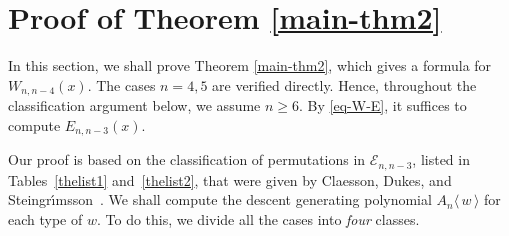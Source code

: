 \documentclass[11pt]{article}
\newcommand{\exactly}[2]{\ensuremath{\mathcal{E}_{#1,#2}}}
\newcommand{\+}{\mbox{\ensuremath{\scriptstyle{+}}}}
\newcommand{\glob}[1]{\ensuremath{\langle\, #1\,\rangle}}
\begin{document}
\section{Proof of Theorem \ref{main-thm2}}\label{sect-3}


In this section, we shall prove Theorem \ref{main-thm2}, which gives a formula for $W_{n,n-4}(x)$.
The cases $n=4,5$ are verified directly. Hence, throughout the classification argument below, we assume $n\geq6$.
By \eqref{eq-W-E}, it suffices to compute $E_{n,n-3}(x)$.

Our proof is based on the classification of permutations in $\exactly{n}{n-3}$,
listed in  Tables~\ref{thelist1} and~\ref{thelist2},  that were given by Claesson,  Dukes, and
Steingr\'\i msson~\cite{Claesson2010Permutations}. We shall compute the descent generating polynomial $A_n \glob{w}$  for each type of $w$. To do this, we divide all the cases into {\em four} classes.
\end{document}
